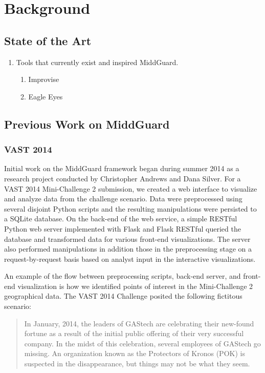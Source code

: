 \chapter{Background}

\section{State of the Art}
  \begin{enumerate}
    \item Tools that currently exist and inspired MiddGuard.
    \begin{enumerate}
      \item Improvise
      \item Eagle Eyes
    \end{enumerate}
  \end{enumerate}

\section{Previous Work on MiddGuard}
\subsection{VAST 2014}

Initial work on the MiddGuard framework began during summer 2014 as a research
project conducted by Christopher Andrews and Dana Silver. For a VAST 2014 Mini-Challenge
2 \cite{vast2014mc2} submission, we created a web interface to
visualize and analyze data from the challenge scenario. Data were preprocessed
using several disjoint Python scripts and the resulting manipulations were
persisted to a SQLite database. On the back-end of the web service, a simple
RESTful Python web server implemented with Flask \cite{flask} and Flask RESTful
\cite{flask-restful} queried the database and transformed data for various
front-end visualizations. The server also performed manipulations in addition
those in the preprocessing stage on a request-by-request basis based on analyst
input in the interactive visualizations.

An example of the flow between preprocessing scripts, back-end server, and
front-end visualization is how we identified points of interest in the
Mini-Challenge 2 geographical data. The VAST 2014 Challenge \cite{vast2014}
posited the following fictitous scenario:

\begin{quote}

In January, 2014, the leaders of GAStech are celebrating their new-found fortune
as a result of the initial public offering of their very successful company. In
the midst of this celebration, several employees of GAStech go missing. An
organization known as the Protectors of Kronos (POK) is suspected in the
disappearance, but things may not be what they seem.

\end{quote}

